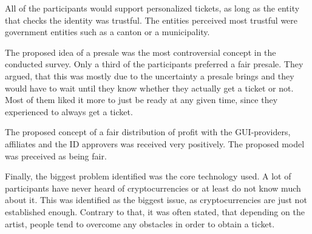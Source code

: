 All of the participants would support personalized tickets, as long as the entity that checks the identity was trustful. The entities perceived most trustful were government entities such as a canton or a municipality.

The proposed idea of a presale was the most controversial concept in the conducted survey. Only a third of the participants preferred a fair presale. They argued, that this was mostly due to the uncertainty a presale brings and they would have to wait until they know whether they actually get a ticket or not. Most of them liked it more to just be ready at any given time, since they experienced to always get a ticket. 

The proposed concept of a fair distribution of profit with the GUI-providers, affiliates and the ID approvers was received very positively. The proposed model was preceived as being fair.

Finally, the biggest problem identified was the core technology used. A lot of participants have never heard of cryptocurrencies or at least do not know much about it. This was identified as the biggest issue, as cryptocurrencies are just not established enough. Contrary to that, it was often stated, that depending on the artist, people tend to overcome any obstacles in order to obtain a ticket.
